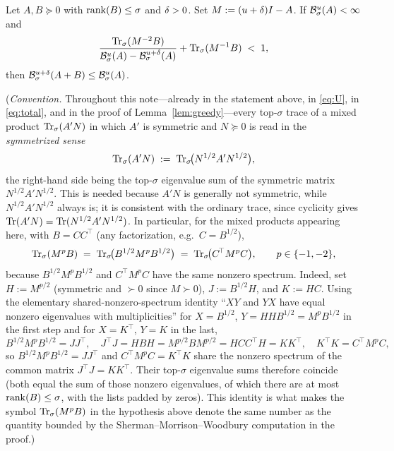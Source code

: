 \begin{qsixlemma}\label{lem:bu}
Let $A,B\succeq 0$ with $\operatorname{rank}(B)\le\sigma$ and $\delta>0$. Set $M:=(u+\delta)I-A$. If
$\mathcal{B}^{u}_{\sigma}(A)<\infty$ and
\[
  \frac{\operatorname{Tr}_{\sigma}(M^{-2}B)}{\mathcal{B}^{u}_{\sigma}(A)-\mathcal{B}^{u+\delta}_{\sigma}(A)}
   + \operatorname{Tr}_{\sigma}(M^{-1}B) \;<\; 1,
\]
then $\mathcal{B}^{u+\delta}_{\sigma}(A+B)\le\mathcal{B}^{u}_{\sigma}(A)$.

\smallskip
\noindent\textup{(\emph{Convention.}} Throughout this note---already in the
statement above, in \eqref{eq:U}, in \eqref{eq:total}, and in the proof of
Lemma~\textup{\ref{lem:greedy}}---every top-$\sigma$ trace of a mixed product
$\operatorname{Tr}_{\sigma}(A'N)$ in which $A'$ is symmetric and $N\succeq0$ is read in the
\emph{symmetrized sense}
\[
  \operatorname{Tr}_{\sigma}(A'N) \;:=\; \operatorname{Tr}_{\sigma}\!\bigl(N^{1/2}A'N^{1/2}\bigr),
\]
the right-hand side being the top-$\sigma$ eigenvalue sum of the symmetric matrix
$N^{1/2}A'N^{1/2}$.  This is needed because $A'N$ is generally not symmetric, while
$N^{1/2}A'N^{1/2}$ always is; it is consistent with the ordinary trace, since
cyclicity gives $\operatorname{Tr}(A'N)=\operatorname{Tr}(N^{1/2}A'N^{1/2})$.  In particular, for the
mixed products appearing here, with $B=CC^{\!\top}$ \textup{(}any factorization,
e.g.\ $C=B^{1/2}$\textup{)},
\begin{equation}\label{eq:bu-shared-spectrum}
  \operatorname{Tr}_{\sigma}(M^{p}B) \;=\; \operatorname{Tr}_{\sigma}\!\bigl(B^{1/2}M^{p}B^{1/2}\bigr)
                 \;=\; \operatorname{Tr}_{\sigma}\!\bigl(C^{\!\top}M^{p}C\bigr),
  \qquad p\in\{-1,-2\},
\end{equation}
because $B^{1/2}M^{p}B^{1/2}$ and $C^{\!\top}M^{p}C$ have the same nonzero
spectrum.  Indeed, set $H:=M^{p/2}$ \textup{(}symmetric and $\succ0$ since
$M\succ0$\textup{)}, $J:=B^{1/2}H$, and $K:=HC$.  Using the elementary
shared-nonzero-spectrum identity ``$XY$ and $YX$ have equal nonzero eigenvalues
with multiplicities'' for $X=B^{1/2}$, $Y=HHB^{1/2}=M^{p}B^{1/2}$ in the first
step and for $X=K^{\!\top}$, $Y=K$ in the last,
\[
  B^{1/2}M^{p}B^{1/2}=JJ^{\!\top},\quad
  J^{\!\top}J=HBH=M^{p/2}BM^{p/2}=HCC^{\!\top}H=KK^{\!\top},\quad
  K^{\!\top}K=C^{\!\top}M^{p}C,
\]
so $B^{1/2}M^{p}B^{1/2}=JJ^{\!\top}$ and $C^{\!\top}M^{p}C=K^{\!\top}K$ share the
nonzero spectrum of the common matrix $J^{\!\top}J=KK^{\!\top}$.  Their top-$\sigma$
eigenvalue sums therefore coincide \textup{(}both equal the sum of those nonzero
eigenvalues, of which there are at most $\operatorname{rank}(B)\le\sigma$, with the lists
padded by zeros\textup{)}.
This identity is what makes the symbol $\operatorname{Tr}_{\sigma}(M^{p}B)$ in the hypothesis above
denote the same number as the quantity bounded by the Sherman--Morrison--Woodbury
computation in the proof.\textup{)}
\end{qsixlemma}


